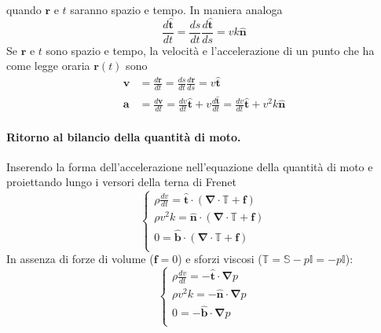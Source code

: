  quando $\bm{r}$ e $t$ saranno spazio e tempo.
In maniera analoga
\begin{equation}
 \frac{d\bm{\hat{t}}}{dt} = \frac{ds}{dt}\frac{d\bm{\hat{t}}}{ds} = 
  v k \bm{\hat{n}}
\end{equation}
Se $\bm{r}$ e $t$ sono spazio e tempo, la velocità e l'accelerazione di un
 punto che ha come legge oraria $\bm{r}(t)$ sono
\begin{equation}
 \begin{aligned}
  \bm{v} & = \frac{d\bm{r}}{dt} = \frac{ds}{dt}\frac{d\bm{r}}{ds} = 
    v \bm{\hat{t}} \\
  \bm{a} & = \frac{d\bm{v}}{dt} =
   \frac{dv}{dt} \bm{\hat{t}} + v \frac{d\bm{\hat{t}}}{dt} =
   \frac{dv}{dt} \bm{\hat{t}} + v^2 k \bm{\hat{n}}
 \end{aligned}
\end{equation}
%
\begin{minipage}{0.60\textwidth}
\paragraph{Ritorno al bilancio della quantità di moto.} Inserendo la
 forma dell'accelerazione nell'equazione della quantità di moto e 
 proiettando lungo i versori della terna di Frenet
\begin{equation}
 \begin{cases}
  \rho \frac{dv}{dt} =  \bm{\hat{t}} \cdot \left(
     \bm{\nabla} \cdot \mathbb{T} + \bm{f} \right) \\
  \rho v^2 k = \bm{\hat{n}} \cdot \left(
     \bm{\nabla} \cdot \mathbb{T} + \bm{f} \right) \\
  0 = \bm{\hat{b}} \cdot \left(
     \bm{\nabla} \cdot \mathbb{T} + \bm{f} \right) \\
 \end{cases}
\end{equation}
In assenza di forze di volume ($\bm{f}=0$) e sforzi viscosi
($\mathbb{T}=\mathbb{S}-p\mathbb{I}=-p\mathbb{I}$):
\begin{equation}
 \begin{cases}
  \rho \frac{dv}{dt} = - \bm{\hat{t}} \cdot \bm{\nabla} p \\
  \rho v^2 k         = - \bm{\hat{n}} \cdot \bm{\nabla} p \\
  0                  = - \bm{\hat{b}} \cdot \bm{\nabla} p \\
 \end{cases}
\end{equation}
\end{minipage}
